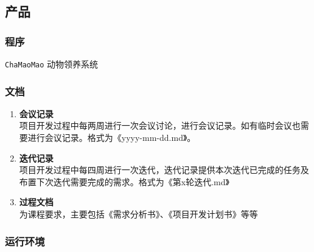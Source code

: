 \documentclass[12pt,a4paper,UTF8]{article}
\begin{document}
\subsection{产品}

\subsubsection{程序}
\verb|ChaMaoMao| 动物领养系统

\subsubsection{文档}
\begin{enumerate}
  \item \textbf{会议记录} \\
  项目开发过程中每两周进行一次会议讨论，进行会议记录。如有临时会议也需要进行会议记录。格式为《yyyy-mm-dd.md》。
  \item \textbf{迭代记录} \\
  项目开发过程中每四周进行一次迭代，迭代记录提供本次迭代已完成的任务及布置下次迭代需要完成的需求。格式为《第x轮迭代.md》
  \item \textbf{过程文档} \\
  为课程要求，主要包括《需求分析书》、《项目开发计划书》等等
\end{enumerate}

\subsubsection{运行环境}
\end{document}
